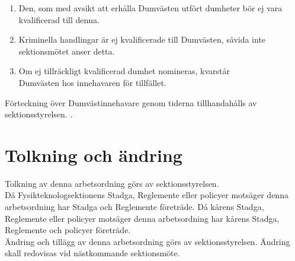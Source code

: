    \begin{enumerate}
      \item Den, som med avsikt att erhålla Dumvästen utfört dumheter
      bör ej vara kvalificerad till denna.
      \item Kriminella handlingar är ej kvalificerade till Dumvästen,
      såvida inte sektionsmötet anser detta.
      \item Om ej tillräckligt kvalificerad dumhet nomineras, kvarstår\\
      Dum\-väst\-en hos innehavaren för tillfället.
    \end{enumerate}

  \item Förteckning över Dumvästinnehavare genom tiderna tillhandahålls av sektionsstyrelsen. .


\section{Tolkning och ändring}
Tolkning av denna arbetsordning görs av sektionsstyrelsen.\\ Då Fysikteknologsektionens Stadga, Reglemente eller policyer motsäger denna arbetsordning har Stadga och Reglemente företräde. Då kårens Stadga, Reglemente eller policyer motsäger denna arbetsordning har kårens Stadga, Reglemente och policyer företräde.\\
Ändring och tillägg av denna arbetsordning görs av sektionsstyrelsen. Ändring skall redovisas vid nästkommande sektionsmöte. 

\newpage